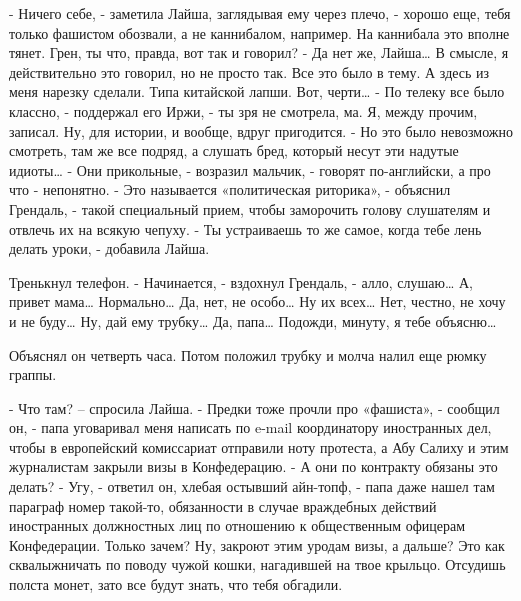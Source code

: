 \documentclass{book}
\begin{document}
- Ничего себе, - заметила Лайша, заглядывая ему через плечо, - хорошо еще, тебя только фашистом обозвали, а не каннибалом, например. На каннибала это вполне тянет. Грен, ты что, правда, вот так и говорил?
- Да нет же, Лайша\ldots{} В смысле, я действительно это говорил, но не просто так. Все это было в тему. А здесь из меня нарезку сделали. Типа китайской лапши. Вот, черти\ldots{}
- По телеку все было классно, - поддержал его Иржи, - ты зря не смотрела, ма. Я, между прочим, записал. Ну, для истории, и вообще, вдруг пригодится.
- Но это было невозможно смотреть, там же все подряд, а слушать бред, который несут эти надутые идиоты\ldots{}
- Они прикольные, - возразил мальчик, - говорят по-английски, а про что - непонятно.
- Это называется «политическая риторика», - объяснил Грендаль, - такой специальный прием, чтобы заморочить голову слушателям и отвлечь их на всякую чепуху.
- Ты устраиваешь то же самое, когда тебе лень делать уроки, - добавила Лайша.

Тренькнул телефон.
- Начинается, - вздохнул Грендаль, - алло, слушаю\ldots{} А, привет мама\ldots{} Нормально\ldots{} Да, нет, не особо\ldots{} Ну их всех\ldots{} Нет, честно, не хочу и не буду\ldots{} Ну, дай ему трубку\ldots{} Да, папа\ldots{} Подожди, минуту, я тебе объясню\ldots{}

Объяснял он четверть часа. Потом положил трубку и молча налил еще рюмку граппы.

- Что там? -- спросила Лайша.
- Предки тоже прочли про «фашиста», - сообщил он, - папа уговаривал меня написать по e-mail координатору иностранных дел, чтобы в европейский комиссариат отправили ноту протеста, а Абу Салиху и этим журналистам закрыли визы в Конфедерацию.
- А они по контракту обязаны это делать?
- Угу, - ответил он, хлебая остывший айн-топф, - папа даже нашел там параграф номер такой-то, обязанности в случае враждебных действий иностранных должностных лиц по отношению к общественным офицерам Конфедерации. Только зачем? Ну, закроют этим уродам визы, а дальше? Это как сквалыжничать по поводу чужой кошки, нагадившей на твое крыльцо. Отсудишь полста монет, зато все будут знать, что тебя обгадили.
\end{document}
